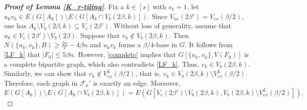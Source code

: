 \documentclass[11pt, a4paper]{article}
\theoremstyle{definition}
\newcommand{\<}{\subseteq}
\begin{document}
\begin{proof}[\bf Proof of Lemma \ref{K_r-tiling}]
Fix a $k\in [s]$ with $s_k=1$,  let $u_kv_k\in E(G[A_k])\setminus E(G[A_k\cap V_b(2\beta,k)])$. 
Since $V_{ne}(2\beta')=V_{ex}(\beta/2)$, one has $A_k\setminus V_b(2\beta,k)\subseteq V_e(2\beta')$. Without loss of generality, assume that $u_k\in V_e(2\beta')\setminus V_b(2\beta)$. Suppose that $v_k\notin V_b(2\beta,k)$. Then  $N(\{u_k,v_k\},B)\geq \frac{2n}{r}-4\beta n$ and $u_kv_k$ forms a $\beta/4$-base in $G$. It follows from \eqref{LF_k} that   $|F_0|\leq 5\beta n$. However, \eqref{complete} implies that $G[\{u_k,v_k\},V(F_0)]$ is a complete bipartite  graph, which also contradicts \eqref{LF_k}. Thus, $v_k\in V_b(2\beta,k)$. Similarly, we can show that $v_k\notin V_{ex}^L(\beta/2)$, that is,  $v_k\in V_b(2\beta,k)\setminus V_{ex}^L(\beta/2)$. Therefore, each graph in $\mathcal{F}_k'$ is exactly an edge. Moreover, $$
E(G[A_k])\setminus E(G[A_k\cap V_b(2\beta,k)])=E(G[V_e(2\beta')\setminus V_b(2\beta,k),V_b(2\beta,k)\setminus V_{ex}^L(\beta/2)]).
$$







\end{proof}
\end{document}
